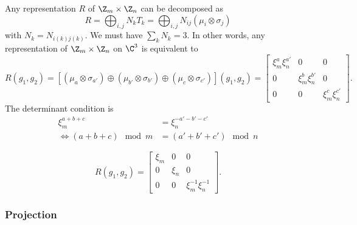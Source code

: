 \documentclass{worksheetclass}
\begin{document}
           Any representation $R$ of $\Z_m\times\Z_n$ can be decomposed as
           \begin{equation}
               R=\bigoplus_{i,j}N_k T_k=\bigoplus_{i,j}N_{ij}(\mu_{i}\otimes\sigma_{j})
           \end{equation}
           with $N_k=N_{i(k)j(k)}$. We must have $\sum_kN_k=3$. In other words, any representation of $\Z_m\times\Z_n$ on $\C^3$ is equivalent to
           \begin{equation}
                R(g_1,g_2)=[(\mu_{a}\otimes\sigma_{a'})\oplus(\mu_{b'}\otimes\sigma_{b'})\oplus(\mu_{c}\otimes\sigma_{c'})](g_1,g_2)=
               \begin{bmatrix}
                   \xi^a_m\xi^{a'}_n & 0 & 0 \\
                   0 & \xi^b_m\xi^{b'}_n & 0 \\
                   0 & 0 & \xi^c_m\xi^{c'}_n
               \end{bmatrix}.
           \end{equation}
           The determinant condition is
           \begin{align}
                \xi^{a+b+c}_m &= \xi^{-a'-b'-c'}_n\\
               \Leftrightarrow (a+b+c)\mod m &= (a'+b'+c')\mod n
           \end{align}

           

           \begin{equation}
            R(g_1,g_2)=
           \begin{bmatrix}
               \xi_m & 0 & 0 \\
               0 & \xi_n & 0 \\
               0 & 0 & \xi^{-1}_m\xi^{-1}_n
           \end{bmatrix}.
       \end{equation}

    \subsubsection{Projection}
\end{document}
